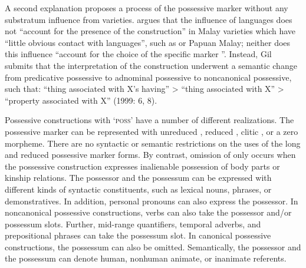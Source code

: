 A second explanation proposes a  process of the possessive marker without any substratum influence from  varieties. \citet[2]{Gil.1999} argues that the influence of  languages does not “account for the presence of the \textit{ }construction” in Malay varieties which have “little obvious contact with  languages”, such as  or Papuan Malay; neither does this influence “account for the choice of the specific marker ”. Instead, Gil submits that the interpretation of the  construction underwent a semantic change from predicative possessive to adnominal possessive to noncanonical possessive, such that: “thing associated with X’s having” {\textgreater} “thing associated with X” {\textgreater} “property associated with X” {(1999: 6, 8)}.



Possessive constructions with  ‘\textsc{poss}’ have a number of different realizations. The possessive marker can be represented with unreduced , reduced , clitic , or a zero morpheme. There are no syntactic or semantic restrictions on the uses of the long and reduced possessive marker forms. By contrast, omission of  only occurs when the possessive construction expresses inalienable possession of body parts or kinship relations. The possessor and the possessum can be expressed with different kinds of syntactic constituents, such as lexical nouns,  phrases, or demonstratives. In addition, personal pronouns can also express the possessor. In noncanonical possessive constructions, verbs can also take the possessor and/or possessum slots. Further, mid-range quantifiers, temporal adverbs, and prepositional phrases can take the possessum slot. In canonical possessive constructions, the possessum can also be omitted. Semantically, the possessor and the possessum can denote human, nonhuman animate, or inanimate referents.

